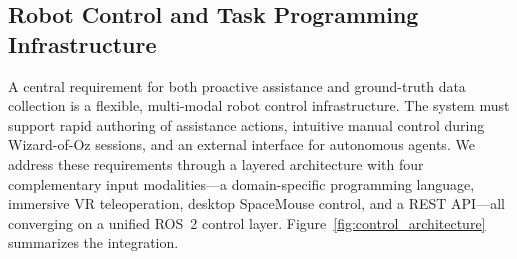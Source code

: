 \documentclass[sensors,article,submit,pdftex,moreauthors]{Definitions/mdpi}
\begin{document}
\subsection{Robot Control and Task Programming Infrastructure}
\label{sec:control_infrastructure}

A central requirement for both proactive assistance and ground-truth data collection is a flexible, multi-modal robot control infrastructure. The system must support rapid authoring of assistance actions, intuitive manual control during Wizard-of-Oz sessions, and an external interface for autonomous agents. We address these requirements through a layered architecture with four complementary input modalities---a domain-specific programming language, immersive VR teleoperation, desktop SpaceMouse control, and a REST API---all converging on a unified ROS~2 control layer. Figure~\ref{fig:control_architecture} summarizes the integration.
\end{document}
